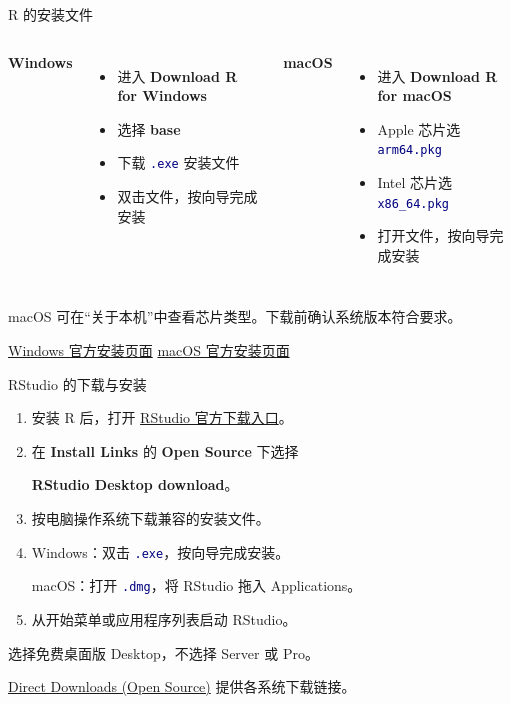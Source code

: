 \documentclass[14pt,compress,t,noamsthm,notheorem,table,handout,fontset=none]{ctexbeamer}
\newcommand{\code}[1]{\textcolor{navy}{\texttt{#1}}}
\begin{document}
\begin{frame}{R 的安装文件}
  \begin{columns}[T,onlytextwidth]
      \textbf{Windows}
      \begin{itemize}
        \item 进入 \textbf{Download R for Windows}
        \item 选择 \textbf{base}
        \item 下载 \code{.exe} 安装文件
        \item 双击文件，按向导完成安装
      \end{itemize}
      \textbf{macOS}
      \begin{itemize}
        \item 进入 \textbf{Download R for macOS}
        \item Apple 芯片选 \code{arm64.pkg}
        \item Intel 芯片选 \code{x86\_64.pkg}
        \item 打开文件，按向导完成安装
      \end{itemize}
  \end{columns}
  \vfill
  {\small macOS 可在“关于本机”中查看芯片类型。下载前确认系统版本符合要求。\par
   \href{https://cran.r-project.org/bin/windows/base/}{Windows 官方安装页面}\qquad
   \href{https://cran.r-project.org/bin/macosx/}{macOS 官方安装页面}}
\end{frame}

\begin{frame}{RStudio 的下载与安装}
  \small
  \begin{enumerate}
    \item 安装 R 后，打开 \href{https://docs.posit.co/ide/user/\#open-source}{RStudio 官方下载入口}。
    \item 在 \textbf{Install Links} 的 \textbf{Open Source} 下选择\par
      \textbf{RStudio Desktop download}。
    \item 按电脑操作系统下载兼容的安装文件。
    \item Windows：双击 \code{.exe}，按向导完成安装。\par
      macOS：打开 \code{.dmg}，将 RStudio 拖入 Applications。
    \item 从开始菜单或应用程序列表启动 RStudio。
  \end{enumerate}
  \vfill
  选择免费桌面版 Desktop，不选择 Server 或 Pro。\par
  \href{https://docs.posit.co/ide/user/\#direct-downloads-open-source}{Direct Downloads (Open Source)} 提供各系统下载链接。
\end{frame}
\end{document}
